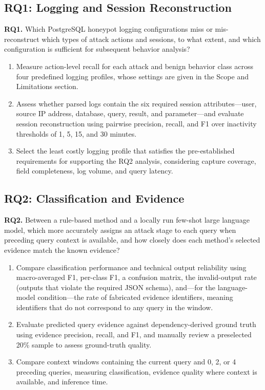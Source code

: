 \documentclass[12pt,a4paper]{report}
\begin{document}
\subsection{RQ1: Logging and Session Reconstruction}
\textbf{RQ1.} Which PostgreSQL honeypot logging configurations miss or mis-reconstruct which types of attack actions and sessions, to what extent, and which configuration is sufficient for subsequent behavior analysis?
\begin{enumerate}[label=\textbf{RO1.\arabic*:}]
    \item Measure action-level recall for each attack and benign behavior class across four predefined logging profiles, whose settings are given in the Scope and Limitations section.
    \item Assess whether parsed logs contain the six required session attributes---user, source IP address, database, query, result, and parameter---and evaluate session reconstruction using pairwise precision, recall, and F1 over inactivity thresholds of 1, 5, 15, and 30 minutes.
    \item Select the least costly logging profile that satisfies the pre-established requirements for supporting the RQ2 analysis, considering capture coverage, field completeness, log volume, and query latency.
\end{enumerate}

\subsection{RQ2: Classification and Evidence}
\textbf{RQ2.} Between a rule-based method and a locally run few-shot large language model, which more accurately assigns an attack stage to each query when preceding query context is available, and how closely does each method's selected evidence match the known evidence?
\begin{enumerate}[label=\textbf{RO2.\arabic*:}]
    \item Compare classification performance and technical output reliability using macro-averaged F1, per-class F1, a confusion matrix, the invalid-output rate (outputs that violate the required JSON schema), and---for the language-model condition---the rate of fabricated evidence identifiers, meaning identifiers that do not correspond to any query in the window.
    \item Evaluate predicted query evidence against dependency-derived ground truth using evidence precision, recall, and F1, and manually review a preselected 20\% sample to assess ground-truth quality.
    \item Compare context windows containing the current query and 0, 2, or 4 preceding queries, measuring classification, evidence quality where context is available, and inference time.
\end{enumerate}
\end{document}
